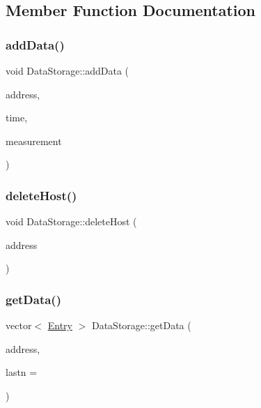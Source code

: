 \subsection{Member Function Documentation}
\mbox{\label{class_data_storage_ab46b18762db5b17b3e0a97150079cb78}} 
\subsubsection{\texorpdfstring{add\+Data()}{addData()}}
{\footnotesize\ttfamily void Data\+Storage\+::add\+Data (\begin{DoxyParamCaption}\item[{Q\+Host\+Address}]{address,  }\item[{qint64}]{time,  }\item[{float}]{measurement }\end{DoxyParamCaption})}

\mbox{\label{class_data_storage_a6d1d74566ca198c807a9dbbb16019472}} 
\subsubsection{\texorpdfstring{delete\+Host()}{deleteHost()}}
{\footnotesize\ttfamily void Data\+Storage\+::delete\+Host (\begin{DoxyParamCaption}\item[{quint32}]{address }\end{DoxyParamCaption})}

\mbox{\label{class_data_storage_a716fe9bd808cb8ea9f0ef153bf01a633}} 
\subsubsection{\texorpdfstring{get\+Data()}{getData()}}
{\footnotesize\ttfamily vector$<$ \mbox{\hyperlink{struct_entry}{Entry}} $>$ Data\+Storage\+::get\+Data (\begin{DoxyParamCaption}\item[{Q\+Host\+Address}]{address,  }\item[{unsigned int}]{lastn = {} }\end{DoxyParamCaption})}

